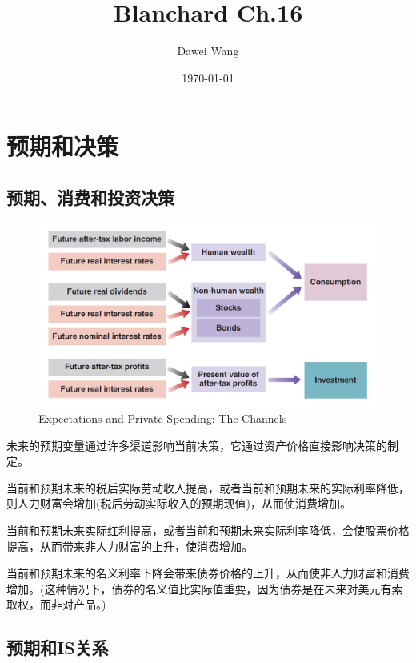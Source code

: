 \documentclass{article}
\title{Blanchard Ch.16}
\author{Dawei Wang}
\date{\today}
\begin{document}
	\maketitle

\section{预期和决策}

\subsection{预期、消费和投资决策}

\begin{figure}[H] %
	\centering %
	\includegraphics[width=1\textwidth]{16_1} %
	\caption{Expectations and Private
		Spending: The Channels} %
	\label{Fig.main2} %
\end{figure}

未来的预期变量通过许多渠道影响当前决策，它通过资产价格直接影响决策的制定。

当前和预期未来的税后实际劳动收入提高，或者当前和预期未来的实际利率降低，则人力财富会增加(税后劳动实际收入的预期现值)，从而使消费增加。

当前和预期未来实际红利提高，或者当前和预期未来实际利率降低，会使股票价格提高，从而带来非人力财富的上升，使消费增加。

当前和预期未来的名义利率下降会带来债券价格的上升，从而使非人力财富和消费增加。(这种情况下，债券的名义值比实际值重要，因为债券是在未来对美元有索取权，而非对产品。)

\subsection{预期和IS关系}
\end{document}
